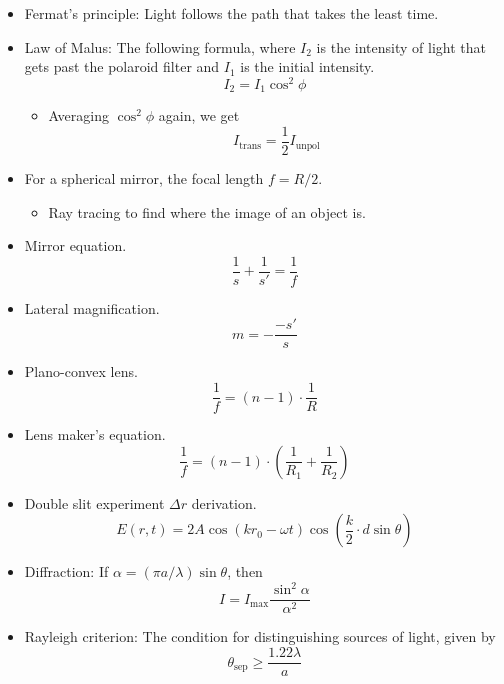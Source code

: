 \documentclass[../notes.tex]{subfiles}
\begin{document}
\begin{itemize}
    \item Fermat's principle: Light follows the path that takes the least time.
    \item Law of Malus: The following formula, where $I_2$ is the intensity of light that gets past the polaroid filter and $I_1$ is the initial intensity.
    \begin{equation*}
        I_2 = I_1\cos^2\phi
    \end{equation*}
    \begin{itemize}
        \item Averaging $\cos^2\phi$ again, we get
        \begin{equation*}
            I_\text{trans} = \frac{1}{2}I_\text{unpol}
        \end{equation*}
    \end{itemize}
    \item For a spherical mirror, the focal length $f=R/2$.
    \begin{itemize}
        \item Ray tracing to find where the image of an object is.
    \end{itemize}
    \item Mirror equation.
    \begin{equation*}
        \frac{1}{s}+\frac{1}{s'} = \frac{1}{f}
    \end{equation*}
    \item Lateral magnification.
    \begin{equation*}
        m = -\frac{-s'}{s}
    \end{equation*}
    \item Plano-convex lens.
    \begin{equation*}
        \frac{1}{f} = (n-1)\cdot\frac{1}{R}
    \end{equation*}
    \item Lens maker's equation.
    \begin{equation*}
        \frac{1}{f} = (n-1)\cdot\left( \frac{1}{R_1}+\frac{1}{R_2} \right)
    \end{equation*}
    \item Double slit experiment $\Delta r$ derivation.
    \begin{equation*}
        E(r,t) = 2A\cos(kr_0-\omega t)\cos(\frac{k}{2}\cdot d\sin\theta)
    \end{equation*}
    \item Diffraction: If $\alpha=(\pi a/\lambda)\sin\theta$, then
    \begin{equation*}
        I = I_\text{max}\frac{\sin^2\alpha}{\alpha^2}
    \end{equation*}
    \item Rayleigh criterion: The condition for distinguishing sources of light, given by
    \begin{equation*}
        \theta_\text{sep} \geq \frac{1.22\lambda}{a}
    \end{equation*}
\end{itemize}
\end{document}
